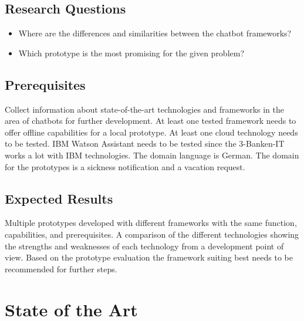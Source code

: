 \documentclass[12pt, backref]{report}
\begin{document}
\section{Research Questions}
\begin{itemize}
	\item Where are the differences and similarities between the chatbot frameworks?
	\item Which prototype is the most promising for the given problem?
\end{itemize}

\section{Prerequisites} \label{sec:prereq}
Collect information about state-of-the-art technologies and frameworks in the area of chatbots for further development.
At least one tested framework needs to offer offline capabilities for a local prototype.
At least one cloud technology needs to be tested.
IBM Watson Assistant needs to be tested since the 3-Banken-IT works a lot with IBM technologies.
The domain language is German.
The domain for the prototypes is a sickness notification and a vacation request.


\section{Expected Results}
Multiple prototypes developed with different frameworks with the same function, capabilities, and prerequisites.
A comparison of the different technologies showing the strengths and weaknesses of each technology from a development point of view.
Based on the prototype evaluation the framework suiting best needs to be recommended for further steps.


\chapter{State of the Art} \label{chap:soa}
\end{document}
